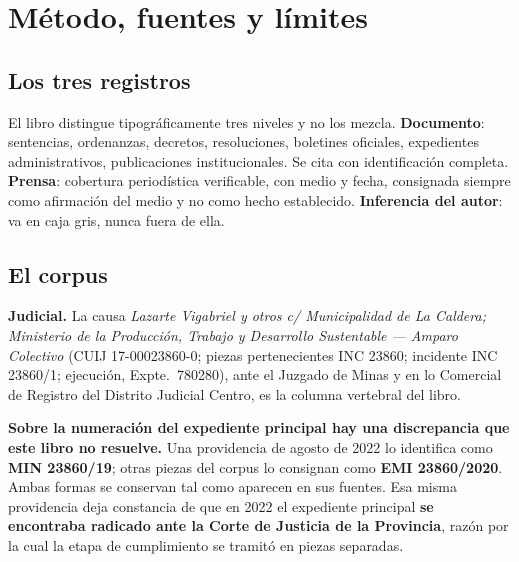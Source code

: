 \chapter{Método, fuentes y límites}

\label{cap:metodo}
\section{Los tres registros}

El libro distingue tipográficamente tres niveles y no los mezcla. \textbf{Documento}: sentencias, ordenanzas, decretos, resoluciones, boletines oficiales, expedientes administrativos, publicaciones institucionales. Se cita con identificación completa. \textbf{Prensa}: cobertura periodística verificable, con medio y fecha, consignada siempre como afirmación del medio y no como hecho establecido. \textbf{Inferencia del autor}: va en caja gris, nunca fuera de ella.

\section{El corpus}

\textbf{Judicial.} La causa \textit{Lazarte Vigabriel y otros c/ Municipalidad de La Caldera; Ministerio de la Producción, Trabajo y Desarrollo Sustentable --- Amparo Colectivo} (CUIJ 17-00023860-0; piezas pertenecientes INC 23860; incidente INC 23860/1; ejecución, Expte.\ 780280), ante el Juzgado de Minas y en lo Comercial de Registro del Distrito Judicial Centro, es la columna vertebral del libro.

\textbf{Sobre la numeración del expediente principal hay una discrepancia que este libro no resuelve.} Una providencia de agosto de 2022 lo identifica como \textbf{MIN 23860/19}; otras piezas del corpus lo consignan como \textbf{EMI 23860/2020}. Ambas formas se conservan tal como aparecen en sus fuentes. Esa misma providencia deja constancia de que en 2022 el expediente principal \textbf{se encontraba radicado ante la Corte de Justicia de la Provincia}, razón por la cual la etapa de cumplimiento se tramitó en piezas separadas.

